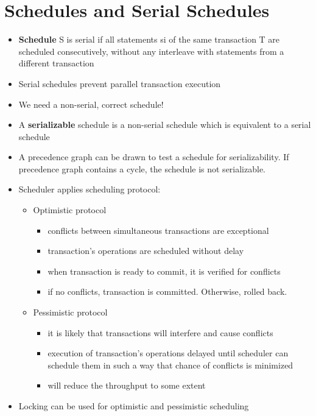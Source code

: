 \documentclass{report}
\begin{document}
\section{Schedules and Serial Schedules}
\begin{itemize}
    \item \textbf{Schedule} S is serial if all statements si of the same transaction T are scheduled
    consecutively, without any interleave with statements from a different transaction
    \item Serial schedules prevent parallel transaction execution
    \item We need a non-serial, correct schedule!
    \item A \textbf{serializable} schedule is a non-serial schedule which is equivalent to a serial schedule
    \item A precedence graph can be drawn to test a schedule for serializability. If precedence graph contains a cycle, the schedule is not serializable.
    \item Scheduler applies scheduling protocol:
    \begin{itemize}
        \item Optimistic protocol
        \begin{itemize}
            \item conflicts between simultaneous transactions are exceptional
            \item transaction’s operations are scheduled without delay
            \item when transaction is ready to commit, it is verified for conflicts
            \item if no conflicts, transaction is committed. Otherwise, rolled back.
        \end{itemize}
        \item Pessimistic protocol
        \begin{itemize}
            \item it is likely that transactions will interfere and cause conflicts
            \item execution of transaction’s operations delayed until scheduler can schedule them in such a way that chance of conflicts is minimized
            \item will reduce the throughput to some extent
        \end{itemize}
    \end{itemize}
    \item Locking can be used for optimistic and pessimistic scheduling

\end{itemize}
\end{document}
